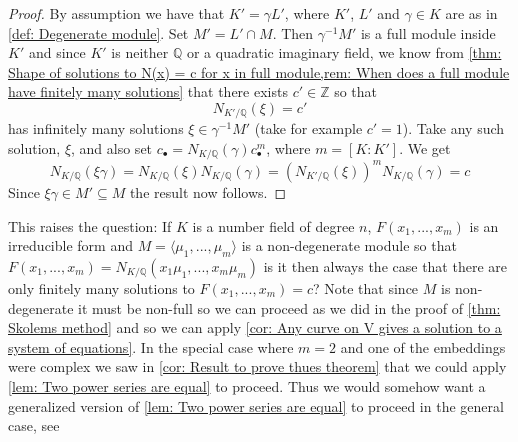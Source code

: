 \documentclass{article}
\newcommand{\mbb}[1]{\mathbb{#1}}
\numberwithin{equation}{section}
\begin{document}
\begin{proof}
	By assumption we have that $K' = \gamma L'$, where $K'$, $L'$ and $\gamma \in K$ are as in \cref{def: Degenerate module}. Set $M' = L' \cap M$. Then $\gamma^{-1}M'$ is a full module inside $K'$ and since $K'$ is neither $\mbb Q$ or a quadratic imaginary field, we know from \cref{thm: Shape of solutions to N(x) = c for x in full module,rem: When does a full module have finitely many solutions} that there exists $c' \in \mbb Z$ so that
	$$N_{K' / \mbb Q}(\xi) = c'$$
	has infinitely many solutions $\xi \in \gamma^{-1}M'$ (take for example $c' = 1$). Take any such solution, $\xi$, and also set $c_\bullet = N_{K / \mbb Q}(\gamma)c_\bullet^m$, where $m = [K : K']$. We get
	$$N_{K / \mbb Q}(\xi \gamma) = N_{K / \mbb Q}(\xi) N_{K / \mbb Q}(\gamma) = (N_{K' / \mbb Q}(\xi))^m N_{K / \mbb Q}(\gamma) = c$$
	Since $\xi\gamma \in M' \subseteq M$ the result now follows.
\end{proof}
This raises the question: If $K$ is a number field of degree $n$, $F(x_1, ..., x_m)$ is an irreducible form and $M = \langle\mu_1, ..., \mu_m \rangle$ is a non-degenerate module so that $F(x_1, ..., x_m) = N_{K/\mbb Q}(x_1\mu_1, ..., x_m\mu_m)$ is it then always the case that there are only finitely many solutions to $F(x_1, ..., x_m) = c$? Note that since $M$ is non-degenerate it must be non-full so we can proceed as we did in the proof of \cref{thm: Skolems method} and so we can apply \cref{cor: Any curve on V gives a solution to a system of equations}. In the special case where $m = 2$ and one of the embeddings were complex we saw in \cref{cor: Result to prove thues theorem} that we could apply \cref{lem: Two power series are equal} to proceed. Thus we would somehow want a generalized version of \cref{lem: Two power series are equal} to proceed in the general case, see \citep[p. 300]{borevich}  



\end{document}
